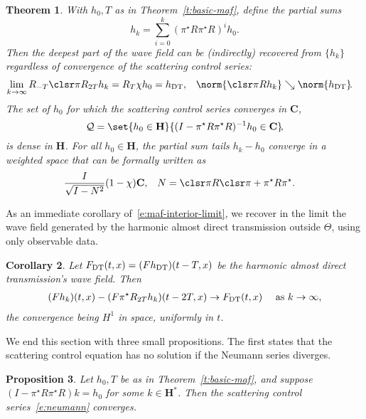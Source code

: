 \documentclass[10pt]{article}
\theoremstyle{plain}
\newtheorem{theorem}{Theorem}
\newtheorem{proposition}[theorem]{Proposition}
\newtheorem{corollary}[theorem]{Corollary}
\theoremstyle{definition}
\theoremstyle{remark}
\numberwithin{theorem}{section}
\numberwithin{example}{section}
\numberwithin{equation}{section}
\numberwithin{figure}{section}
\newcommand\DT{\ensuremath{_{\text{\normalfont DT}}}}		%
\begin{document}
\begin{theorem}
	With $h_0, T$ as in Theorem~\ref{t:basic-maf}, define the partial sums
	\begin{equation}
		h_k = \sum_{i=0}^k (\pi^\star R\pi^\star R)^i h_0.
		\label{e:partial-sums}
	\end{equation}
	Then the deepest part of the wave field can be (indirectly) recovered from $\{h_k\}$ regardless of convergence of the scattering control series:
	\begin{align}
		\lim_{k\to\infty} R_{-T}\clsr\pi R_{2T}h_k &=  R_T\chi h_0 = h\DT,
		&
		\norm{\clsr\pi Rh_k}&\searrow\norm{h\DT}\!.
		\label{e:maf-interior-limit}
	\end{align}
	The set of $h_0$ for which the scattering control series converges in $\mathbf C$,
	\begin{equation}
		\mathcal Q = \set{h_0\in\mathbf H}{(I-\pi^\star R\pi^\star R)^{-1} h_0\in\mathbf C}\!,
		\label{e:Q-definition}
	\end{equation}
	is dense in $\mathbf H$.
	For all $h_0\in\mathbf H$, the partial sum tails $h_k-h_0$ converge in a weighted space that can be formally written as
	\begin{align}
		&\frac{I}{\sqrt{I-N^2}}(1-\chi)\mathbf C,
		&
		N &= \clsr\pi R\clsr\pi + \pi^\star R\pi^\star.
		\label{e:space-of-maf-convergence}
	\end{align}
	\label{t:limit-maf}
\end{theorem}

As an immediate corollary of~\eqref{e:maf-interior-limit}, we recover in the limit the wave field generated by the harmonic almost direct transmission outside $\Theta$, using only observable data.

\begin{corollary}
	Let $F\DT(t,x) = (Fh\DT)(t-T,x)$ be the harmonic almost direct transmission's wave field. Then
	\begin{align}
		(Fh_k)(t,x) - (F\pi^\star R_{2T}h_k)(t-2T,x)&\to F\DT(t,x)
		&
		\text{ as } k\to\infty,
	\end{align}
	the convergence being $H^1$ in space, uniformly in $t$.
	\label{c:dt-wave field}
\end{corollary}

We end this section with three small propositions. 
The first states that the scattering control equation has no solution if the Neumann series diverges.
\begin{proposition}
	Let $h_0, T$ be as in Theorem~\ref{t:basic-maf}, and suppose $(I-\pi^\star R\pi^\star R)k=h_0$ for some $k\in \mathbf H^*$. Then the scattering control series~\eqref{e:neumann} converges.
	\label{p:only-neumann}
\end{proposition}
\end{document}
